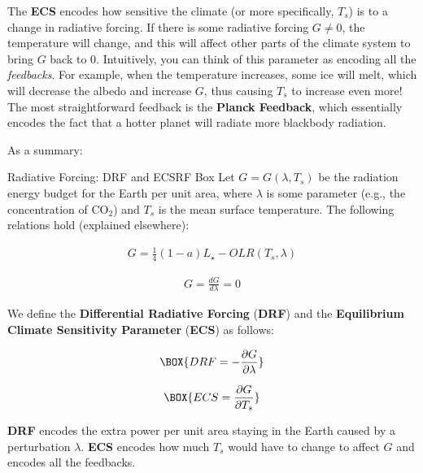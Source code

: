 The \textbf{ECS} encodes how sensitive the climate (or more specifically, $T_s$) is to a change in radiative forcing. If there is some radiative forcing $G\neq 0$, the temperature will change, and this will affect other parts of the climate system to bring $G$ back to 0. Intuitively, you can think of this parameter as encoding all the \textit{feedbacks}. For example, when the temperature increases, some ice will melt, which will decrease the albedo and increase $G$, thus causing $T_s$ to increase even more! The most straightforward feedback is the \textbf{Planck Feedback}, which essentially encodes the fact that a hotter planet will radiate more blackbody radiation.

As a summary:
\begin{fact}{Radiative Forcing: DRF and ECS}{RF Box}\label{RF Box}
    Let $G=G(\lambda,T_s)$ be the radiation energy budget for the Earth per unit area, where $\lambda$ is some parameter (e.g., the concentration of CO$_2$) and $T_s$ is the mean surface temperature. The following relations hold (explained elsewhere):

    \begin{minipage}{0.5\linewidth}
        \begin{gather*}
            G = \frac{1}{4}(1-a)L_\star-OLR(T_s,\lambda)
        \end{gather*}
    \end{minipage}
    \begin{minipage}{0.5\linewidth}
        \begin{gather*}
            G = \frac{dG}{d\lambda} = 0
        \end{gather*}
    \end{minipage}
    We define the \textbf{Differential Radiative Forcing} (\textbf{DRF}) and the \textbf{Equilibrium Climate Sensitivity Parameter} (\textbf{ECS}) as follows:

    \begin{minipage}{0.5\linewidth}
        \begin{gather}
            \BOX{DRF = -\frac{\partial G}{\partial \lambda}}
        \end{gather}
    \end{minipage}
    \begin{minipage}{0.5\linewidth}
        \begin{gather}
            \BOX{ECS = \frac{\partial G}{\partial T_s}}
        \end{gather}
    \end{minipage}

    \textbf{DRF} encodes the extra power per unit area staying in the Earth caused by a perturbation $\lambda$. \textbf{ECS} encodes how much $T_s$ would have to change to affect $G$ and encodes all the feedbacks.
\end{fact}

